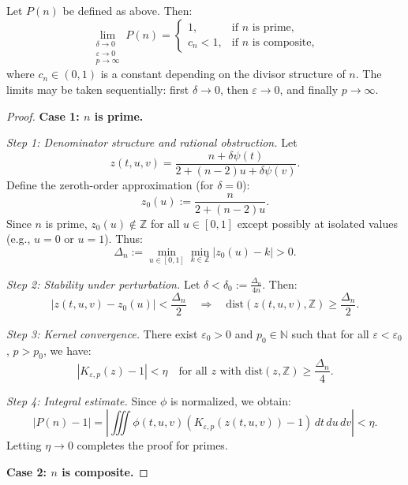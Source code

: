\documentclass[10pt,a4paper]{amsart}
\begin{document}
\begin{theorem}
\label{thm:asymptotic}
Let \( P(n) \) be defined as above. Then:
\[
\lim_{\substack{\delta \to 0 \\ \varepsilon \to 0 \\ p \to \infty}} P(n) = 
\begin{cases}
1, & \text{if } n \text{ is prime}, \\
c_n < 1, & \text{if } n \text{ is composite},
\end{cases}
\]
where \( c_n \in (0,1) \) is a constant depending on the divisor structure of \( n \). The limits may be taken sequentially: first \( \delta \to 0 \), then \( \varepsilon \to 0 \), and finally \( p \to \infty \).
\end{theorem}

\begin{proof}

\textbf{Case 1: \( n \) is prime.}

\textit{Step 1: Denominator structure and rational obstruction.}  
Let
\[
z(t,u,v) = \frac{n + \delta \psi(t)}{2 + (n - 2) u + \delta \psi(v)}.
\]
Define the zeroth-order approximation (for \( \delta = 0 \)):
\[
z_0(u) := \frac{n}{2 + (n - 2)u}.
\]
Since \( n \) is prime, \( z_0(u) \notin \mathbb{Z} \) for all \( u \in [0,1] \) except possibly at isolated values (e.g., \( u = 0 \) or \( u = 1 \)). Thus:
\[
\Delta_n := \min_{u \in [0,1]} \min_{k \in \mathbb{Z}} |z_0(u) - k| > 0.
\]

\textit{Step 2: Stability under perturbation.}  
Let \( \delta < \delta_0 := \frac{\Delta_n}{4n} \). Then:
\[
\left| z(t,u,v) - z_0(u) \right| < \frac{\Delta_n}{2} \quad \Rightarrow \quad \mathrm{dist}(z(t,u,v), \mathbb{Z}) \geq \frac{\Delta_n}{2}.
\]

\textit{Step 3: Kernel convergence.}  
There exist \( \varepsilon_0 > 0 \) and \( p_0 \in \mathbb{N} \) such that for all \( \varepsilon < \varepsilon_0 \), \( p > p_0 \), we have:
\[
|K_{\varepsilon,p}(z) - 1| < \eta \quad \text{for all } z \text{ with } \mathrm{dist}(z, \mathbb{Z}) \geq \frac{\Delta_n}{4}.
\]

\textit{Step 4: Integral estimate.}  
Since \( \phi \) is normalized, we obtain:
\[
|P(n) - 1| = \left| \iiint \phi(t,u,v)(K_{\varepsilon,p}(z(t,u,v)) - 1)\, dt\, du\, dv \right| < \eta.
\]
Letting \( \eta \to 0 \) completes the proof for primes.

\medskip

\textbf{Case 2: \( n \) is composite.}


\end{proof}
\end{document}
